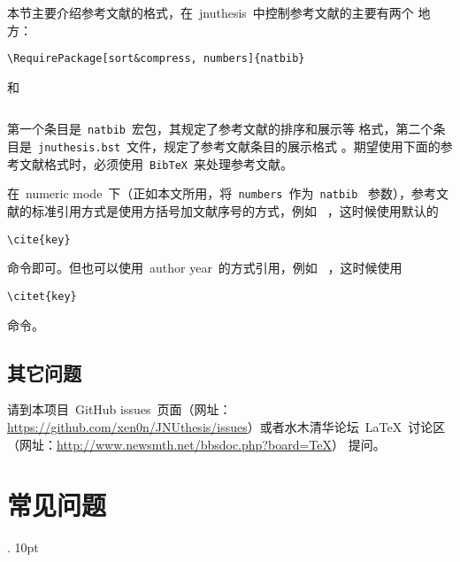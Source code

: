 \documentclass[pdftex, twoside, bachelor]{JNUthesis}
\begin{document}
\begin{spacing}{1.25}
本节主要介绍参考文献的格式，在~jnuthesis~中控制参考文献的主要有两个
地方：

\begin{verbatim}
\RequirePackage[sort&compress, numbers]{natbib}
\end{verbatim}

\noindent 和

\begin{verbatim}

\end{verbatim}

\noindent 第一个条目是~\texttt{natbib}~宏包，其规定了参考文献的排序和展示等
格式，第二个条目是~\texttt{jnuthesis.bst}~文件，规定了参考文献条目的展示格式
。期望使用下面的参考文献格式时，必须使用~\texttt{BibTeX}~来处理参考文献。

在~numeric mode~下（正如本文所用，将~\texttt{numbers}~作为~\texttt{natbib}~
 参数），参考文献的标准引用方式是使用方括号加文献序号的方式，例如~
\cite{Al-Osh1987}，这时候使用默认的~

\begin{verbatim}
\cite{key}
\end{verbatim}

\noindent 命令即可。但也可以使用~author year~的方式引用，例如~
\citet{Al-Osh1987}，这时候使用

\begin{verbatim}
\citet{key}
\end{verbatim}

\noindent 命令。


\section{其它问题}

请到本项目~GitHub issues~页面（网址：
\url{https://github.com/xen0n/JNUthesis/issues}）或者水木清华论坛~\LaTeX{}~讨论区
（网址：\url{http://www.newsmth.net/bbsdoc.php?board=TeX}）
提问。

\chapter{常见问题}
\label{C:FAQ}


  {}%
  {}%
  {\tt}%
  {}%
  {\bfseries}%
  {.}%
  {10pt}%
  {}%


\end{spacing}
\end{document}
